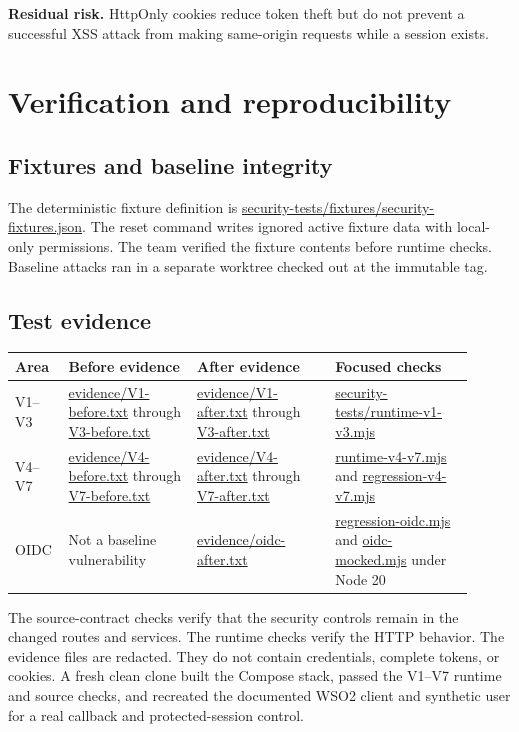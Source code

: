 \documentclass[11pt]{article}
\newcommand{\evidence}[1]{{\small\url{#1}}}
\newcommand{\residual}{\textbf{Residual risk.} }
\begin{document}
\residual HttpOnly cookies reduce token theft but do not prevent a successful XSS attack from making same-origin requests while a session exists.

\section{Verification and reproducibility}\label{sec:verification}
\subsection{Fixtures and baseline integrity}
The deterministic fixture definition is \evidence{security-tests/fixtures/security-fixtures.json}. The reset command writes ignored active fixture data with local-only permissions. The team verified the fixture contents before runtime checks. Baseline attacks ran in a separate worktree checked out at the immutable tag.

\subsection{Test evidence}
\begin{longtable}{P{0.08\linewidth}P{0.26\linewidth}P{0.28\linewidth}P{0.29\linewidth}}
\toprule
{}\textbf{Area} & \textbf{Before evidence} & \textbf{After evidence} & \textbf{Focused checks} \\
\midrule
\endhead
V1--V3 & \evidence{evidence/V1-before.txt} through \evidence{V3-before.txt} & \evidence{evidence/V1-after.txt} through \evidence{V3-after.txt} & \evidence{security-tests/runtime-v1-v3.mjs} \\
V4--V7 & \evidence{evidence/V4-before.txt} through \evidence{V7-before.txt} & \evidence{evidence/V4-after.txt} through \evidence{V7-after.txt} & \evidence{runtime-v4-v7.mjs} and \evidence{regression-v4-v7.mjs} \\
OIDC & Not a baseline vulnerability & \evidence{evidence/oidc-after.txt} & \evidence{regression-oidc.mjs} and \evidence{oidc-mocked.mjs} under Node 20 \\
\bottomrule
\end{longtable}

The source-contract checks verify that the security controls remain in the changed routes and services. The runtime checks verify the HTTP behavior. The evidence files are redacted. They do not contain credentials, complete tokens, or cookies. A fresh clean clone built the Compose stack, passed the V1--V7 runtime and source checks, and recreated the documented WSO2 client and synthetic user for a real callback and protected-session control.
\end{document}
